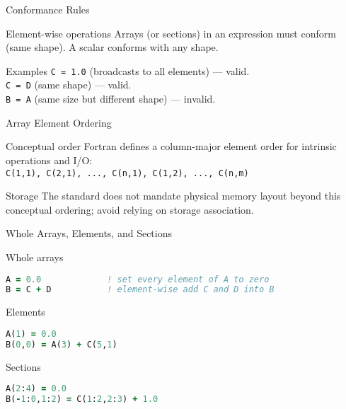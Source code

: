 
\begin{frame}{Conformance Rules}
  \begin{block}{Element-wise operations}
    Arrays (or sections) in an expression must conform (same shape). A scalar conforms with any shape.
  \end{block}
  \begin{block}{Examples}
    \texttt{C = 1.0} (broadcasts to all elements) — valid.\\
    \texttt{C = D} (same shape) — valid.\\
    \texttt{B = A} (same size but different shape) — invalid.
  \end{block}
\end{frame}

\begin{frame}{Array Element Ordering}
  \begin{block}{Conceptual order}
    Fortran defines a column-major element order for intrinsic operations and I/O:\\
    \texttt{C(1,1), C(2,1), ..., C(n,1), C(1,2), ..., C(n,m)}
  \end{block}
  \begin{block}{Storage}
    The standard does not mandate physical memory layout beyond this conceptual ordering; avoid relying on storage association.
  \end{block}
\end{frame}


\begin{frame}[fragile]{Whole Arrays, Elements, and Sections}
  \begin{block}{Whole arrays}
\begin{lstlisting}[language=Fortran]
A = 0.0             ! set every element of A to zero
B = C + D           ! element-wise add C and D into B
\end{lstlisting}
  \end{block}
  \begin{block}{Elements}
\begin{lstlisting}[language=Fortran]
A(1) = 0.0
B(0,0) = A(3) + C(5,1)
\end{lstlisting}
  \end{block}
  \begin{block}{Sections}
\begin{lstlisting}[language=Fortran]
A(2:4) = 0.0
B(-1:0,1:2) = C(1:2,2:3) + 1.0
\end{lstlisting}
  \end{block}
\end{frame}

